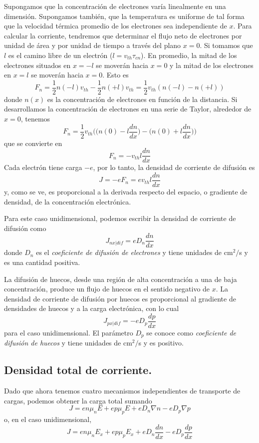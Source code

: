 \documentclass[12pt,a4paper]{article}
\begin{document}
Supongamos que la concentración de electrones varía linealmente en una dimensión. Supongamos también, que la temperatura es uniforme de tal forma que la velocidad térmica promedio de los electrones sea independiente de $x$. Para calcular la corriente, tendremos que determinar el flujo neto de electrones por unidad de área y por unidad de tiempo a través del plano $x=0$. Si tomamos que $l$ es el camino libre de un electrón ($l=v_{th}\tau _{cn}$). En promedio, la mitad de los electrones situados en $x=-l$ se moverán hacia $x=0$ y la mitad de los electrones en $x=l$ se moverán hacia $x=0$. Esto es
\[ F_{n} = \frac{1}{2} n(-l)v_{th} - \frac{1}{2} n(+l)v_{th} = \frac{1}{2}v_{th}(n(-l)-n(+l)) \]
donde $n(x)$ es la concentración de electrones en función de la distancia. Si desarrollamos la concentración de electrones en una serie de Taylor, alrededor de $x=0$, tenemos
\[ F_{n} = \frac{1}{2} v_{th} \bigg( \bigg( n(0) - l \frac{dn}{dx}\bigg) - \bigg( n(0)+l\frac{dn}{dx} \bigg) \bigg) \]
que se convierte en
\[ F_{n} = -v_{th}l \frac{dn}{dx} \]
Cada electrón tiene carga $-e$, por lo tanto, la densidad de corriente de difusión es
\[ J=-eF_{n}=ev_{th}l\frac{dn}{dx} \]
y, como se ve, es proporcional a la derivada respecto del espacio, o gradiente de densidad, de la concentración electrónica.

Para este caso unidimensional, podemos escribir la densidad de corriente de difusión como
\[ J_{nx|dif}=eD_{n} \frac{dn}{dx} \]
donde $D_{n}$ es el \emph{coeficiente de difusión de electrones} y tiene unidades de cm$^{2}/$s y es una cantidad positiva.

La difusión de huecos, desde una región de alta concentración a una de baja concentración, produce un flujo de huecos en el sentido negativo de $x$. La densidad de corriente de difusión por huecos es proporcional al gradiente de densidades de huecos y a la carga electrónica, con lo cual
\[ J_{px|dif}=-eD_{p} \frac{dp}{dx} \]
para el caso unidimensional. El parámetro $D_{p}$ se conoce como \emph{coeficiente de difusión de huecos} y tiene unidades de cm$^{2}/$s y es positivo.

\subsection{Densidad total de corriente.}

Dado que ahora tenemos cuatro mecanismos independientes de transporte de cargas, podemos obtener la carga total sumando
\[ J=en\mu _{n}E+ep\mu _{p}E+eD_{n} \nabla n - eD_{p} \nabla p \]
o, en el caso unidimensional,
\[ J=en\mu _{n}E_{x}+ep\mu _{p}E_{x}+eD_{n} \frac{dn}{dx} - eD_{p} \frac{dp}{dx} \]
\end{document}
